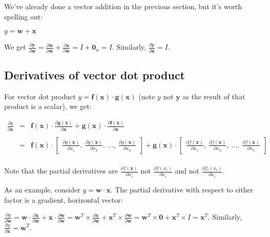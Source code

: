 \documentclass[11pt]{article}
\begin{document}
We've already done a vector addition in the previous section, but it's worth spelling out:
 
$y = \mathbf{w} + \mathbf{x}$

We get $\frac{\partial \mathbf{y}}{\partial \mathbf{w}} = \frac{\partial \mathbf{w}}{\partial \mathbf{w}} + \frac{\partial \mathbf{x}}{\partial \mathbf{w}} = I + \mathbf{0}_n = I$. Similarly, $\frac{\partial \mathbf{y}}{\partial \mathbf{x}} = I$.

\subsection{Derivatives of vector dot product}

For vector dot product $y = \mathbf{f(x)} \cdot \mathbf{g(x)}$ (note $y$ not $\mathbf{y}$ as the result of that product is a scalar), we get:

$
\begin{array}{rcl}
\frac{\partial y}{\partial \mathbf{x}} & = & \mathbf{f(x)} \cdot \frac{\partial \mathbf{g(x)}}{\partial \mathbf{x}} + \mathbf{g(x)} \cdot \frac{\partial \mathbf{f(x)}}{\partial \mathbf{x}}\\\\
 & = & \mathbf{f(x)} \cdot \begin{bmatrix} \frac{\partial g(\mathbf{x})}{\partial x_1},~ \frac{\partial g(\mathbf{x})}{\partial x_2},~ \ldots,~ \frac{\partial g(\mathbf{x})}{\partial x_n} \end{bmatrix}  + \mathbf{g(x)} \cdot \begin{bmatrix} \frac{\partial f(\mathbf{x})}{\partial x_1},~ \frac{\partial f(\mathbf{x})}{\partial x_2},~ \ldots,~ \frac{\partial f(\mathbf{x})}{\partial x_n} \end{bmatrix}\\

\end{array}
$

Note that the partial derivatives are $\frac{\partial f(\mathbf{x})}{\partial x_i}$ not $\frac{\partial f(x_i)}{\partial x_i}$ and not $\frac{\partial f_i(x_i)}{\partial x_i}$.

As an example, consider $y = \mathbf{w} \cdot \mathbf{x}$. The partial derivative with respect to either factor is a gradient, horizontal vector:

$\frac{\partial y}{\partial \mathbf{w}} = \mathbf{w} \cdot \frac{\partial \mathbf{x}}{\partial \mathbf{w}} + \mathbf{x} \cdot \frac{\partial \mathbf{w}}{\partial \mathbf{w}} = \mathbf{w}^T \times \frac{\partial \mathbf{x}}{\partial \mathbf{w}} + \mathbf{x}^T \times \frac{\partial \mathbf{w}}{\partial \mathbf{w}} = \mathbf{w}^T \times \mathbf{0} + \mathbf{x}^T \times I = \mathbf{x}^T$. Similarly, $\frac{\partial y}{\partial \mathbf{x}} = \mathbf{w}^T$.
\end{document}
